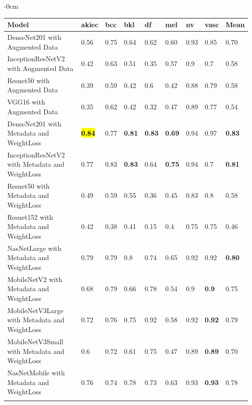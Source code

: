 \documentclass[sensors,article,accept,pdftex,moreauthors]{Definitions/mdpi}
\begin{document}
\begin{table}[H]
	
\begin{adjustwidth}{-\extralength}{0cm}
	\footnotesize{
	\begin{tabular}{|l|l|l|l|l|l|l|l|l|} 
		\noalign{\hrule height 1pt}
		\textbf{Model} & \textbf{akiec} & \textbf{bcc} & \textbf{bkl} & \textbf{df} & \textbf{mel} & \textbf{nv} & \textbf{vasc} & \textbf{Mean} \\
		\hline
		DenseNet201 with Augmented Data & 0.56 & 0.75 & 0.64 & 0.62 & 0.60 & 0.93 & 0.85 & 0.70 \\ 
		\hline
		InceptionResNetV2 with Augmented Data & 0.42 &	0.63 & 0.51 & 0.35 & 0.57 & 0.9 & 0.7 & 0.58\\
		\hline
		Resnet50 with Augmented Data & 0.39 & 0.59 & 0.42 & 0.6 & 0.42 & 0.88 & 0.79 & 0.58\\
		\hline 	
		VGG16 with Augmented Data & 0.35 & 0.62 & 0.42 & 0.32 & 0.47 & 0.89 & 0.77 & 0.54\\ 
		\hline		
		DenseNet201 with Metadata and WeightLoss & \textbf{\hl{0.84} %
} & 0.77 & \textbf{0.81} & \textbf{0.83} & \textbf{0.69} & 0.94 & 0.97 & \textbf{0.83}\\
		\hline
		InceptionResNetV2 with Metadata and WeightLoss & 0.77 & 0.83 & \textbf{0.83} & 0.64 & \textbf{0.75} & 0.94 & 0.7 & \textbf{0.81}\\
		\hline
		Resnet50 with Metadata and WeightLoss & 0.49 & 0.59 & 0.55 & 0.36 & 0.45 & 0.83 & 0.8 & 0.58\\
		\hline
		Resnet152 with Metadata and WeightLoss & 0.42 & 0.38 & 0.41 & 0.15 & 0.4 & 0.75 & 0.75 & 0.46\\
		\hline
		NasNetLarge with Metadata and WeightLoss & 0.79 & 0.79 & 0.8 & 0.74 & 0.65 & 0.92 & 0.92 & \textbf{0.80}\\
		\hline
		MobileNetV2 with Metadata and WeightLoss & 0.68 & 0.79 & 0.66 & 0.78 & 0.54 & 0.9 & \textbf{0.9} & 0.75\\
		\hline
		MobileNetV3Large with Metadata and WeightLoss & 0.72 & 0.76 & 0.75 & 0.92 & 0.58 & 0.92 & \textbf{0.92} & 0.79\\
		\hline
		MobileNetV3Small with Metadata and WeightLoss & 0.6 & 0.72 & 0.61 & 0.75 & 0.47 & 0.89 & \textbf{0.89} & 0.70\\
		\hline
		NasNetMobile with Metadata and WeightLoss & 0.76 & 0.74 & 0.78 & 0.73 & 0.63 & 0.93 & \textbf{0.93} & 0.78\\
		\noalign{\hrule height 1pt}
	\end{tabular}}
\end{adjustwidth}
\end{table}
\end{document}
